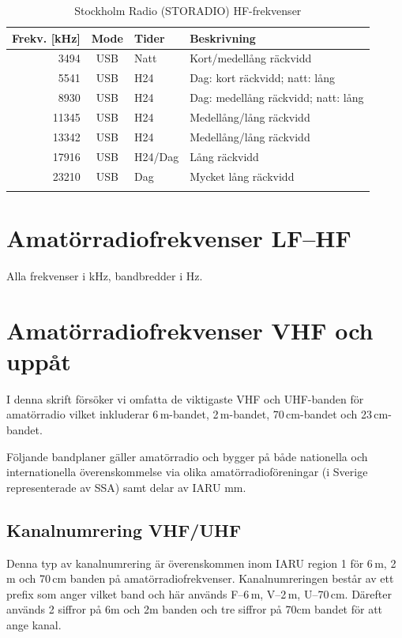 \begin{longtable}{rcll}
  \textbf{Frekv. [kHz]} &
  \textbf{Mode}         &
  \textbf{Tider} &
  \textbf{Beskrivning} \\ \hline
  \endhead

 3494 & USB & Natt    & Kort/medellång räckvidd             \\
 5541 & USB & H24     & Dag: kort räckvidd; natt: lång      \\
 8930 & USB & H24     & Dag: medellång räckvidd; natt: lång \\
11345 & USB & H24     & Medellång/lång räckvidd             \\
13342 & USB & H24     & Medellång/lång räckvidd             \\
17916 & USB & H24/Dag & Lång räckvidd                       \\
23210 & USB & Dag     & Mycket lång räckvidd                \\
  \caption{Stockholm Radio (STORADIO) HF-frekvenser}                                   \\
\end{longtable}


\section{Amatörradiofrekvenser LF--HF}

Alla frekvenser i kHz, bandbredder i Hz.




\section{Amatörradiofrekvenser VHF och uppåt}

I denna skrift försöker vi omfatta de viktigaste VHF och UHF-banden
för amatörradio vilket inkluderar 6\,m-bandet, 2\,m-bandet,
70\,cm-bandet och 23\,cm-bandet.

Följande bandplaner gäller amatörradio och bygger på både nationella och
internationella överenskommelse via olika amatörradioföreningar (i Sverige
representerade av SSA) samt delar av IARU mm.

\subsection{Kanalnumrering VHF/UHF}

Denna typ av kanalnumrering är överenskommen inom IARU region 1 för
6\,m, 2\,m och 70\,cm banden på
amatörradiofrekvenser. Kanalnumreringen består av ett prefix som anger
vilket band och här används F--6\,m, V--2\,m, U--70\,cm. Därefter
används 2 siffror på 6m och 2m banden och tre siffror på 70cm bandet
för att ange kanal.

